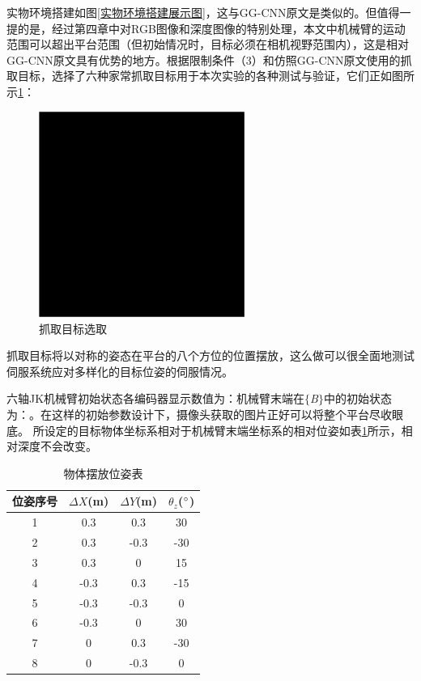 \documentclass[fontset=fandol,type=bachelor,campus=harbin,bsmainpagenumberline=true]{hithesisbook}
\begin{document}
实物环境搭建如图\ref{实物环境搭建展示图}，这与GG-CNN原文是类似的。但值得一提的是，经过第四章中对RGB图像和深度图像的特别处理，本文中机械臂的运动范围可以超出平台范围（但初始情况时，目标必须在相机视野范围内），这是相对GG-CNN原文具有优势的地方。根据限制条件（3）和仿照GG-CNN原文使用的抓取目标，选择了六种家常抓取目标用于本次实验的各种测试与验证，它们正如图所示\ref{抓取目标选取}：
\begin{figure}[h]
	\centering
	\includegraphics[width=0.6\textwidth]{chapter6/替身}
	\caption{抓取目标选取}
	\label{抓取目标选取}
\end{figure}


抓取目标将以对称的姿态在平台的八个方位的位置摆放，这么做可以很全面地测试伺服系统应对多样化的目标位姿的伺服情况。


六轴JK机械臂初始状态各编码器显示数值为：机械臂末端在$\lbrace$\textit{B}$\rbrace$中的初始状态为：。在这样的初始参数设计下，摄像头获取的图片正好可以将整个平台尽收眼底。
所设定的目标物体坐标系相对于机械臂末端坐标系的相对位姿如表\ref{物体摆放位姿表}所示，相对深度不会改变。
\begin{table}[htbp]
\caption{物体摆放位姿表}
\label{物体摆放位姿表}
\vspace{0.5em}\centering\wuhao
\begin{tabular}{cccc}
\toprule[2pt]
位姿序号 & $\varDelta X$(m) & $\varDelta Y$(m) & $\theta _z$($\degree$)\\
\midrule[1pt]
 1 & 0.3 & 0.3 & 30\\
 2 & 0.3 & -0.3 & -30\\
 3 & 0.3 & 0 & 15\\
 4 & -0.3 & 0.3 & -15\\
 5 & -0.3 & -0.3 & 0\\
 6 & -0.3 & 0 & 30\\
 7 & 0 & 0.3 & -30\\
 8 & 0 & -0.3 & 0\\

\bottomrule[1.5pt]
\end{tabular}
\end{table}
\end{document}
